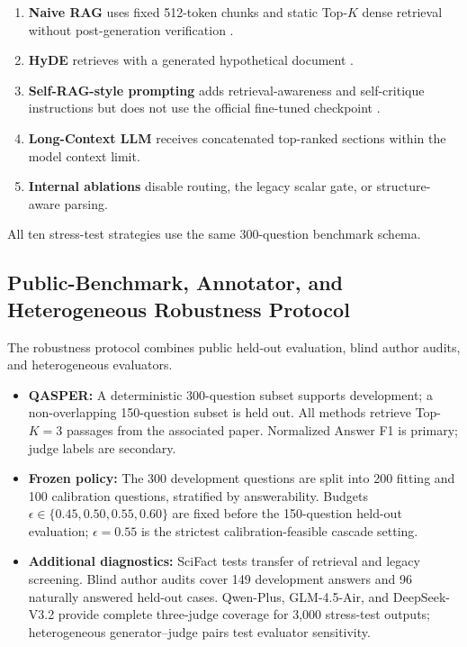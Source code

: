 \documentclass[smallextended]{svjour3}
\begin{document}
\begin{enumerate}
    \item \textbf{Naive RAG} uses fixed 512-token chunks and static Top-$K$ dense retrieval without post-generation verification \citep{lewis2020retrieval}.
    \item \textbf{HyDE} retrieves with a generated hypothetical document \citep{gao2022precise}.
    \item \textbf{Self-RAG-style prompting} adds retrieval-awareness and self-critique instructions but does not use the official fine-tuned checkpoint \citep{asai2023self}.
    \item \textbf{Long-Context LLM} receives concatenated top-ranked sections within the model context limit.
    \item \textbf{Internal ablations} disable routing, the legacy scalar gate, or structure-aware parsing.
\end{enumerate}
All ten stress-test strategies use the same 300-question benchmark schema.

\subsection{Public-Benchmark, Annotator, and Heterogeneous Robustness Protocol}
\label{subsec:ood_setup}
The robustness protocol combines public held-out evaluation, blind author audits, and heterogeneous evaluators.

\begin{itemize}
    \item \textbf{QASPER:} A deterministic 300-question subset supports development; a non-overlapping 150-question subset is held out. All methods retrieve Top-$K=3$ passages from the associated paper. Normalized Answer F1 is primary; judge labels are secondary.

    \item \textbf{Frozen policy:} The 300 development questions are split into 200 fitting and 100 calibration questions, stratified by answerability. Budgets $\epsilon\in\{0.45,0.50,0.55,0.60\}$ are fixed before the 150-question held-out evaluation; $\epsilon=0.55$ is the strictest calibration-feasible cascade setting.

    \item \textbf{Additional diagnostics:} SciFact tests transfer of retrieval and legacy screening. Blind author audits cover 149 development answers and 96 naturally answered held-out cases. Qwen-Plus, GLM-4.5-Air, and DeepSeek-V3.2 provide complete three-judge coverage for 3,000 stress-test outputs; heterogeneous generator--judge pairs test evaluator sensitivity.

\end{itemize}
\end{document}
